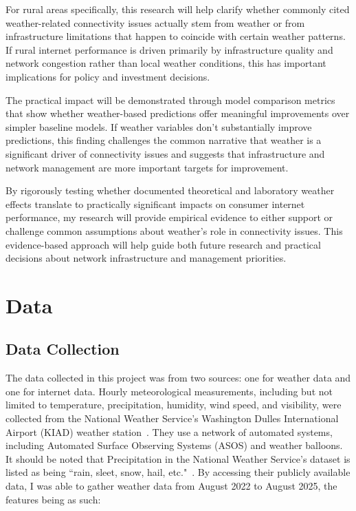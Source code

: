 \documentclass[11pt]{report}
\begin{document}
For rural areas specifically, this research will help clarify whether commonly cited weather-related connectivity issues actually stem from weather or from infrastructure limitations that happen to coincide with certain weather patterns. If rural internet performance is driven primarily by infrastructure quality and network congestion rather than local weather conditions, this has important implications for policy and investment decisions.

The practical impact will be demonstrated through model comparison metrics that show whether weather-based predictions offer meaningful improvements over simpler baseline models. If weather variables don't substantially improve predictions, this finding challenges the common narrative that weather is a significant driver of connectivity issues and suggests that infrastructure and network management are more important targets for improvement.

By rigorously testing whether documented theoretical and laboratory weather effects translate to practically significant impacts on consumer internet performance, my research will provide empirical evidence to either support or challenge common assumptions about weather's role in connectivity issues. This evidence-based approach will help guide both future research and practical decisions about network infrastructure and management priorities.

\chapter{Data}

\section{Data Collection}

The data collected in this project was from two sources: one for weather data and one for internet data. Hourly meteorological measurements, including but not limited to temperature, precipitation, humidity, wind speed, and visibility, were collected from the National Weather Service's Washington Dulles International Airport (KIAD) weather station~\cite{nws2024timeseries}. They use a network of automated systems, including Automated Surface Observing Systems (ASOS) and weather balloons. It should be noted that Precipitation in the National Weather Service's dataset is listed as being ``rain, sleet, snow, hail, etc."~\cite{nws2024precipitation}. By accessing their publicly available data, I was able to gather weather data from August 2022 to August 2025, the features being as such:
\end{document}

